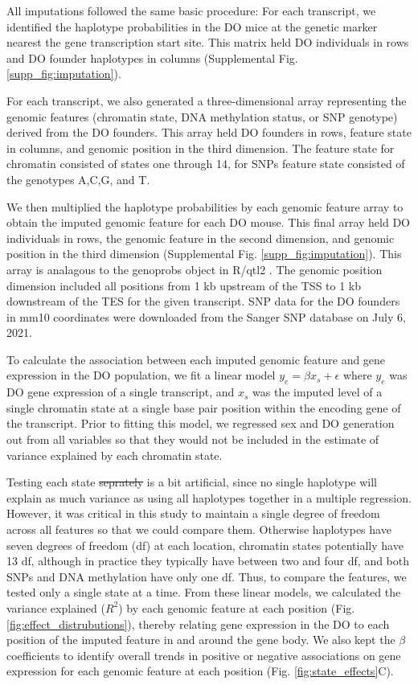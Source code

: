 \documentclass[
  11pt,
]{article}
\providecommand{\DIFaddtex}[1]{{\protect\color{blue}\uwave{#1}}} %
\providecommand{\DIFdeltex}[1]{{\protect\color{red}\sout{#1}}}                      %
\providecommand{\DIFaddbegin}{} %
\providecommand{\DIFaddend}{} %
\providecommand{\DIFdelbegin}{} %
\providecommand{\DIFdelend}{} %
\providecommand{\DIFadd}[1]{\texorpdfstring{\DIFaddtex{#1}}{#1}} %
\providecommand{\DIFdel}[1]{\texorpdfstring{\DIFdeltex{#1}}{}} %
\newcommand{\DIFscaledelfig}{0.5}
\newlength{\DIFdelgraphicswidth} %
\newlength{\DIFdelgraphicsheight} %
\newcommand{\DIFaddincludegraphics}[2][]{{\color{blue}\fbox{\DIFOincludegraphics[#1]{#2}}}} %
\newcommand{\DIFdelincludegraphics}[2][]{%
\sbox{\DIFdelgraphicsbox}{\DIFOincludegraphics[#1]{#2}}%
\settoboxwidth{\DIFdelgraphicswidth}{\DIFdelgraphicsbox} %
\settoboxtotalheight{\DIFdelgraphicsheight}{\DIFdelgraphicsbox} %
\scalebox{\DIFscaledelfig}{%
\parbox[b]{\DIFdelgraphicswidth}{\usebox{\DIFdelgraphicsbox}\\[-\baselineskip] \rule{\DIFdelgraphicswidth}{0em}}\llap{\resizebox{\DIFdelgraphicswidth}{\DIFdelgraphicsheight}{%
\setlength{\unitlength}{\DIFdelgraphicswidth}%
\begin{picture}(1,1)%
\thicklines\linethickness{2pt} %
{\color[rgb]{1,0,0}\put(0,0){\framebox(1,1){}}}%
{\color[rgb]{1,0,0}\put(0,0){\line( 1,1){1}}}%
{\color[rgb]{1,0,0}\put(0,1){\line(1,-1){1}}}%
\end{picture}%
}\hspace*{3pt}}} %
} %
\DeclareRobustCommand{\DIFaddbegin}{\DIFOaddbegin \let\includegraphics\DIFaddincludegraphics} %
\DeclareRobustCommand{\DIFaddend}{\DIFOaddend \let\includegraphics\DIFOincludegraphics} %
\DeclareRobustCommand{\DIFdelbegin}{\DIFOdelbegin \let\includegraphics\DIFdelincludegraphics} %
\DeclareRobustCommand{\DIFdelend}{\DIFOaddend \let\includegraphics\DIFOincludegraphics} %
\begin{document}
All imputations followed the same basic procedure: For each transcript,
we identified the haplotype probabilities in the DO mice at the genetic
marker nearest the gene transcription start site. This matrix held DO
individuals in rows and DO founder haplotypes in columns (Supplemental
Fig. \ref{supp_fig:imputation}).

For each transcript, we also generated a three-dimensional array
representing the genomic features (chromatin state, DNA methylation
status, or SNP genotype) derived from the DO founders. This array held
DO founders in rows, feature state in columns, and genomic position in
the third dimension. The feature state for chromatin consisted of states
one through 14, for SNPs feature state consisted of the genotypes A,C,G,
and T.

We then multiplied the haplotype probabilities by each genomic feature
array to obtain the imputed genomic feature for each DO mouse. This
final array held DO individuals in rows, the genomic feature in the
second dimension, and genomic position in the third dimension
(Supplemental Fig. \ref{supp_fig:imputation}). This array is analagous
to the genoprobs object in R/qtl2 \citep{pmid30591514}. The genomic
position dimension included all positions from 1 kb upstream of the TSS
to 1 kb downstream of the TES for the given transcript. SNP data for the
DO founders in mm10 coordinates were downloaded from the Sanger SNP
database \citep{keane2011mouse} on July 6, 2021.

To calculate the association between each imputed genomic feature and
gene expression in the DO population, we fit a linear model
\(y_{e} = \beta x_{s} + \epsilon\) where \(y_{e}\) was DO gene
expression of a single transcript, and \(x_{s}\) was the imputed level
of a single chromatin state at a single base pair position within the
encoding gene of the transcript. Prior to fitting this model, we
regressed sex and DO generation out from all variables so that they
would not be included in the estimate of variance explained by each
chromatin state.

Testing each state \DIFdelbegin \DIFdel{seprately }\DIFdelend \DIFaddbegin \DIFadd{separately }\DIFaddend is a bit artificial, since no single
haplotype will explain as much variance as using all haplotypes together
in a multiple regression. However, it was critical in this study to
maintain a single degree of freedom across all features so that we could
compare them. Otherwise haplotypes have seven degrees of freedom (df) at
each location, chromatin states potentially have 13 df, although in
practice they typically have between two and four df, and both SNPs and
DNA methylation have only one df. Thus, to compare the features, we
tested only a single state at a time. From these linear models, we
calculated the variance explained (\(R^2\)) by each genomic feature at
each position (Fig. \ref{fig:effect_distrubutions}), thereby relating
gene expression in the DO to each position of the imputed feature in and
around the gene body. We also kept the \(\beta\) coefficients to
identify overall trends in positive or negative associations on gene
expression for each genomic feature at each position (Fig.
\ref{fig:state_effects}C).
\end{document}

